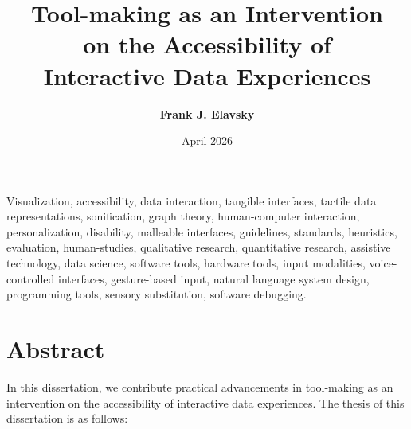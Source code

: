 \documentclass[12pt]{cmuthesis}
\begin{document}
 
\frontmatter

\pagestyle{empty}

\title{
{\bf Tool-making as an Intervention\\ on the Accessibility of \\Interactive Data Experiences}}

\author{\bf Frank J. Elavsky}
\date{April 2026}



\maketitle
\begin{keywords}
Visualization, accessibility, data interaction, tangible interfaces, tactile data representations, sonification, graph theory, human-computer interaction, personalization, disability, malleable interfaces, guidelines, standards, heuristics, evaluation, human-studies, qualitative research, quantitative research, assistive technology, data science, software tools, hardware tools, input modalities, voice-controlled interfaces, gesture-based input, natural language system design, programming tools, sensory substitution, software debugging.
\end{keywords}

\pagestyle{plain} %

\clearpage

\tableofcontents
\listoffigures

\chapter*{Abstract}

In this dissertation, we contribute practical advancements in tool-making as an intervention on the accessibility of interactive data experiences. The thesis of this dissertation is as follows:
\end{document}
